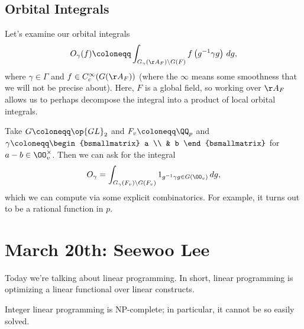 \documentclass{article}
\begin{document}
\subsection{Orbital Integrals}
Let's examine our orbital integrals
\[O_\gamma(f)\coloneqq\int_{G_\gamma(\AA_F)\backslash G(F)}f\left(g^{-1}\gamma g\right)\,dg,\]
where $\gamma\in\Gamma$ and $f\in C_c^\infty(G(\AA_F))$ (where the $\infty$ means some smoothness that we will not be precise about). Here, $F$ is a global field, so working over $\AA_F$ allows us to perhaps decompose the integral into a product of local orbital integrals.
\begin{example}
	Take $G\coloneqq\op{GL}_2$ and $F_v\coloneqq\QQ_p$ and $\gamma\coloneqq\begin{bsmallmatrix}
		a \\ & b
	\end{bsmallmatrix}$ for $a-b\in\OO_v^\times$. Then we can ask for the integral
	\[O_\gamma=\int_{G_\gamma(F_v)\backslash G(F_v)}1_{g^{-1}\gamma g\in G(\OO_v)}\,dg,\]
	which we can compute via some explicit combinatorics. For example, it turns out to be a rational function in $p$.
\end{example}

\section{March 20th: Seewoo Lee}
Today we're talking about linear programming. In short, linear programming is optimizing a linear functional over linear constructs.
\begin{remark}
	Integer linear programming is NP-complete; in particular, it cannot be so easily solved.
\end{remark}
\end{document}
